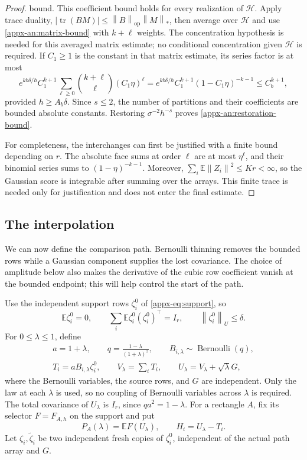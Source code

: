 \documentclass[11pt,letterpaper]{article}
\theoremstyle{remark}
\newcommand{\E}{\mathbb E}
\newcommand{\tr}{\operatorname{tr}}
\newcommand{\norm}[1]{\left\lVert#1\right\rVert}
\begin{document}
\begin{proof}
bound.  This coefficient bound holds for every realization of \(\mathcal H\).
Apply trace duality,
\(|\tr(BM)|\le\norm{B}_{\mathrm{op}}\norm{M}_*\), then average over
\(\mathcal H\) and use \eqref{appx-an:matrix-bound} with \(k+\ell\)
weights. The concentration hypothesis is needed for this averaged matrix
estimate; no conditional concentration given \(\mathcal H\) is required.  If \(C_1\ge1\) is the constant in that matrix estimate, its
series factor is at most
\[
 e^{kb\delta/h}C_1^{k+1}
 \sum_{\ell\ge0}\binom{k+\ell}{\ell}(C_1\eta)^\ell
 =e^{kb\delta/h}C_1^{k+1}(1-C_1\eta)^{-k-1}
 \le C_b^{k+1},
\]
provided \(h\ge A_b\delta\).  Since \(s\le2\), the number of
partitions and their coefficients are bounded absolute constants.
Restoring \(\sigma^{-2}h^{-s}\) proves
\eqref{appx-an:restoration-bound}.

For completeness, the interchanges can first be justified with a
finite bound depending on \(r\).  The absolute face sums at order
\(\ell\) are at most \(\eta^\ell\), and their binomial series sums
to \((1-\eta)^{-k-1}\).  Moreover,
\(\sum_i\E\norm{Z_i}^2\le Kr<\infty\), so the Gaussian score is
integrable after summing over the arrays.  This finite trace is needed
only for justification and does not enter the final estimate.
\end{proof}

\subsection{The interpolation}
\label{appx-an:sec:path}

We can now define the comparison path.  Bernoulli thinning removes the
bounded rows while a Gaussian component supplies the lost covariance.
The choice of amplitude below also makes the derivative of the cubic
row coefficient vanish at the bounded endpoint; this will help control
the start of the path.

Use the independent support rows \(\zeta_i^0\) of
\eqref{appx-eq:support}, so
\[
 \E\zeta_i^0=0,\qquad
 \sum_i\E\zeta_i^0(\zeta_i^0)^\top=I_r,
 \qquad \norm{\zeta_i^0}_U\le\delta.
\]
For \(0\le\lambda\le1\), define
\begin{equation}
 \begin{gathered}
 a=1+\lambda,\qquad q=\frac{1-\lambda}{(1+\lambda)^2},
 \qquad B_{i,\lambda}\sim\operatorname{Bernoulli}(q),\\
 T_i=aB_{i,\lambda}\zeta_i^0,\qquad V_\lambda=\sum_iT_i,
 \qquad U_\lambda=V_\lambda+\sqrt\lambda G,
 \end{gathered}
 \label{appx-an:path}
\end{equation}
where the Bernoulli variables, the source rows, and \(G\) are
independent.  Only the law at each \(\lambda\) is used, so no
coupling of Bernoulli variables across \(\lambda\) is required.
The total covariance of \(U_\lambda\) is \(I_r\), since
\(qa^2=1-\lambda\).  For a rectangle \(A\), fix its selector
\(F=F_{A,h}\) on the support and put
\[
 P_A(\lambda)=\E F(U_\lambda),\qquad H_i=U_\lambda-T_i.
\]
Let \(\zeta_i,\widetilde\zeta_i\) be two independent fresh copies of
\(\zeta_i^0\), independent of the actual path array and \(G\).
\end{document}
